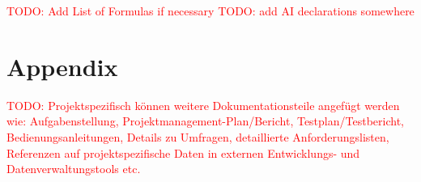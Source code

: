 \documentclass[a4paper,12pt,listof=numbered,toc=chapterentrywithdots]{scrreport}
\renewcommand{\todo}[1]{\textcolor{red}{TODO: #1}}
\begin{document}
	\listoftables
	\todo{Add List of Formulas if necessary}
	\todo{add AI declarations somewhere}
	
	
	\chapter{\bibname}
	\printbibliography[heading=none]

	
	\appendix
	\chapter{Appendix}
		\todo{Projektspezifisch können weitere Dokumentationsteile angefügt werden wie: Aufgabenstellung, Projektmanagement-Plan/Bericht, Testplan/Testbericht, Bedienungsanleitungen, Details zu Umfragen, detaillierte Anforderungslisten, Referenzen auf projektspezifische Daten in externen Entwicklungs- und Datenverwaltungstools etc.}
	
\end{document}
